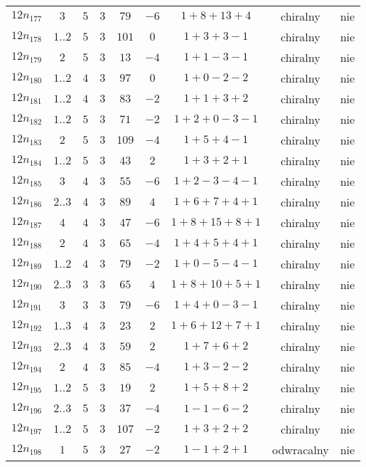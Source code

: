\begin{longtable}{ccccccccc}
$12n_{177}$ & $3$ & $5$ & $3$ & $79$ & $-6$ & $1+8+13+4$ & chiralny & nie \\
$12n_{178}$ & $1..2$ & $5$ & $3$ & $101$ & $0$ & $1+3+3-1$ & chiralny & nie \\
$12n_{179}$ & $2$ & $5$ & $3$ & $13$ & $-4$ & $1+1-3-1$ & chiralny & nie \\
$12n_{180}$ & $1..2$ & $4$ & $3$ & $97$ & $0$ & $1+0-2-2$ & chiralny & nie \\
$12n_{181}$ & $1..2$ & $4$ & $3$ & $83$ & $-2$ & $1+1+3+2$ & chiralny & nie \\
$12n_{182}$ & $1..2$ & $5$ & $3$ & $71$ & $-2$ & $1+2+0-3-1$ & chiralny & nie \\
$12n_{183}$ & $2$ & $5$ & $3$ & $109$ & $-4$ & $1+5+4-1$ & chiralny & nie \\
$12n_{184}$ & $1..2$ & $5$ & $3$ & $43$ & $2$ & $1+3+2+1$ & chiralny & nie \\
$12n_{185}$ & $3$ & $4$ & $3$ & $55$ & $-6$ & $1+2-3-4-1$ & chiralny & nie \\
$12n_{186}$ & $2..3$ & $4$ & $3$ & $89$ & $4$ & $1+6+7+4+1$ & chiralny & nie \\
$12n_{187}$ & $4$ & $4$ & $3$ & $47$ & $-6$ & $1+8+15+8+1$ & chiralny & nie \\
$12n_{188}$ & $2$ & $4$ & $3$ & $65$ & $-4$ & $1+4+5+4+1$ & chiralny & nie \\
$12n_{189}$ & $1..2$ & $4$ & $3$ & $79$ & $-2$ & $1+0-5-4-1$ & chiralny & nie \\
$12n_{190}$ & $2..3$ & $3$ & $3$ & $65$ & $4$ & $1+8+10+5+1$ & chiralny & nie \\
$12n_{191}$ & $3$ & $3$ & $3$ & $79$ & $-6$ & $1+4+0-3-1$ & chiralny & nie \\
$12n_{192}$ & $1..3$ & $4$ & $3$ & $23$ & $2$ & $1+6+12+7+1$ & chiralny & nie \\
$12n_{193}$ & $2..3$ & $4$ & $3$ & $59$ & $2$ & $1+7+6+2$ & chiralny & nie \\
$12n_{194}$ & $2$ & $4$ & $3$ & $85$ & $-4$ & $1+3-2-2$ & chiralny & nie \\
$12n_{195}$ & $1..2$ & $5$ & $3$ & $19$ & $2$ & $1+5+8+2$ & chiralny & nie \\
$12n_{196}$ & $2..3$ & $5$ & $3$ & $37$ & $-4$ & $1-1-6-2$ & chiralny & nie \\
$12n_{197}$ & $1..2$ & $5$ & $3$ & $107$ & $-2$ & $1+3+2+2$ & chiralny & nie \\
$12n_{198}$ & $1$ & $5$ & $3$ & $27$ & $-2$ & $1-1+2+1$ & odwracalny & nie \\

\end{longtable}
